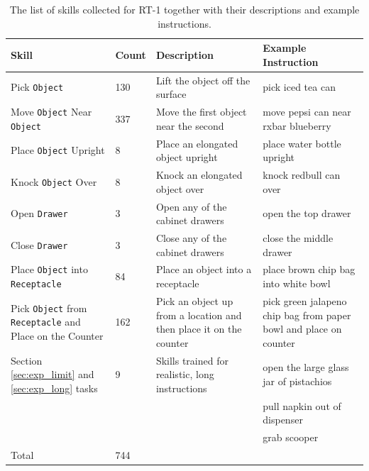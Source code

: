 \documentclass{article} %
\newcommand{\algname}{RT-1\xspace}
\begin{document}
\begin{table}[h!]
\begin{center}
\setlength\tabcolsep{2.0pt}
\scriptsize
\begin{tabular}{p{3.5cm} p{0.75cm} p{4.5cm} p{4cm}}
\toprule
Skill & Count & Description & Example Instruction\\
\midrule

Pick \texttt{Object} & 130 & Lift the object off the surface & pick iced tea can \\

Move \texttt{Object} Near \texttt{Object} & 337 & Move the first object near the second & move pepsi can near rxbar blueberry\\

Place \texttt{Object} Upright & 8 & Place an elongated object upright & place water bottle upright\\

Knock \texttt{Object} Over & 8 & Knock an elongated object over & knock redbull can over\\

Open \texttt{Drawer} & 3 & Open any of the cabinet drawers & open the top drawer \\

Close \texttt{Drawer}  & 3 & Close any of the cabinet drawers & close the middle drawer \\

Place \texttt{Object} into \texttt{Receptacle} & 84 & Place an object into a receptacle & place brown chip bag into white bowl\\


Pick \texttt{Object} from \texttt{Receptacle} and Place on the Counter & 162 & Pick an object up from a location and then place it on the counter  & pick green jalapeno chip bag from paper bowl and place on counter \\
\midrule
Section \ref{sec:exp_limit} and \ref{sec:exp_long} tasks & 9 & Skills trained for realistic, long instructions & open the large glass jar of pistachios \\
& & & pull napkin out of dispenser \\
& & & grab scooper \\






\midrule
Total & 744 \\
\bottomrule
\end{tabular}
\caption{The list of skills collected for \algname together with their descriptions and example instructions.}
\label{table:all_skills}
\end{center}
\end{table}
\end{document}
